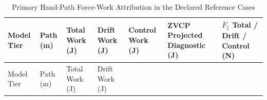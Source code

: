 \documentclass[
  letterpaper,
]{report}
\begin{document}
\begin{longtable}[]{@{}
  >{\raggedright\arraybackslash}p{}
  >{\raggedleft\arraybackslash}p{}
  >{\raggedleft\arraybackslash}p{}
  >{\raggedleft\arraybackslash}p{}
  >{\raggedleft\arraybackslash}p{}
  >{\raggedleft\arraybackslash}p{}
  >{\raggedleft\arraybackslash}p{}@{}}
\caption{Primary Hand-Path Force-Work Attribution in the Declared
Reference Cases}\label{tbl-hand-path-primary-results}\tabularnewline
\toprule\noalign{}
\begin{minipage}[b]{\linewidth}\raggedright
Model Tier
\end{minipage} & \begin{minipage}[b]{\linewidth}\raggedleft
Path (m)
\end{minipage} & \begin{minipage}[b]{\linewidth}\raggedleft
Total Work (J)
\end{minipage} & \begin{minipage}[b]{\linewidth}\raggedleft
Drift Work (J)
\end{minipage} & \begin{minipage}[b]{\linewidth}\raggedleft
Control Work (J)
\end{minipage} & \begin{minipage}[b]{\linewidth}\raggedleft
ZVCP Projected Diagnostic (J)
\end{minipage} & \begin{minipage}[b]{\linewidth}\raggedleft
\(\overline F_{\parallel}\) Total / Drift / Control (N)
\end{minipage} \\
\midrule\noalign{}
\endfirsthead
\toprule\noalign{}
\begin{minipage}[b]{\linewidth}\raggedright
Model Tier
\end{minipage} & \begin{minipage}[b]{\linewidth}\raggedleft
Path (m)
\end{minipage} & \begin{minipage}[b]{\linewidth}\raggedleft
Total Work (J)
\end{minipage} & \begin{minipage}[b]{\linewidth}\raggedleft
Drift Work (J)
\end{minipage} & \begin{minipage}[b]{\linewidth}\raggedleft

\end{minipage}
\end{longtable}
\end{document}
